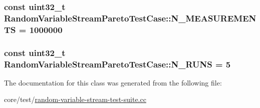\subsubsection[{\texorpdfstring{N\+\_\+\+M\+E\+A\+S\+U\+R\+E\+M\+E\+N\+TS}{N_MEASUREMENTS}}]{\setlength{\rightskip}{0pt plus 5cm}const uint32\+\_\+t Random\+Variable\+Stream\+Pareto\+Test\+Case\+::\+N\+\_\+\+M\+E\+A\+S\+U\+R\+E\+M\+E\+N\+TS = 1000000\hspace{0.3cm}{\ttfamily [static]}}\hypertarget{classRandomVariableStreamParetoTestCase_af8ae7065d2066c50308876e7566636fd}{}\label{classRandomVariableStreamParetoTestCase_af8ae7065d2066c50308876e7566636fd}
\subsubsection[{\texorpdfstring{N\+\_\+\+R\+U\+NS}{N_RUNS}}]{\setlength{\rightskip}{0pt plus 5cm}const uint32\+\_\+t Random\+Variable\+Stream\+Pareto\+Test\+Case\+::\+N\+\_\+\+R\+U\+NS = 5\hspace{0.3cm}{\ttfamily [static]}}\hypertarget{classRandomVariableStreamParetoTestCase_a3dca9876bb2898a06f20edf03c8c12a2}{}\label{classRandomVariableStreamParetoTestCase_a3dca9876bb2898a06f20edf03c8c12a2}


The documentation for this class was generated from the following file\+:\begin{DoxyCompactItemize}
\item 
core/test/\hyperlink{random-variable-stream-test-suite_8cc}{random-\/variable-\/stream-\/test-\/suite.\+cc}\end{DoxyCompactItemize}
